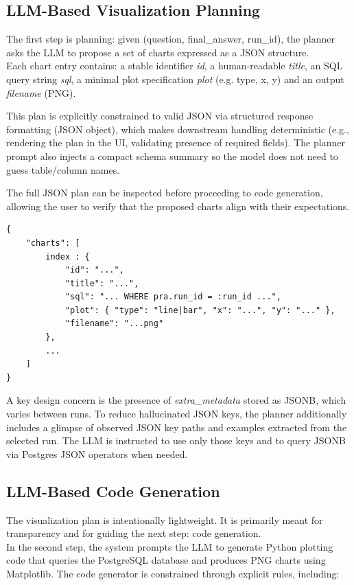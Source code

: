 \subsection{LLM-Based Visualization Planning}

The first step is planning: given (question, final\_answer, run\_id), the planner asks the LLM to propose a set of charts expressed as a JSON structure. \\
Each chart entry contains: a stable identifier \textit{id}, a human-readable \textit{title}, an SQL query string \textit{sql}, a minimal plot specification \textit{plot} (e.g. type, x, y) and an output \textit{filename} (PNG).

This plan is explicitly constrained to valid JSON via structured response formatting (JSON object), which makes downstream handling deterministic (e.g., rendering the plan in the UI, validating presence of required fields). The planner prompt also injects a compact schema summary so the model does not need to guess table/column names.

The full JSON plan can be inspected before proceeding to code generation, allowing the user to verify that the proposed charts align with their expectations.

\begin{lstlisting}[caption={Example Visualization Plan JSON}, label={lst:viz-plan}]
{
    "charts": [
        index : {
            "id": "...",
            "title": "...",
            "sql": "... WHERE pra.run_id = :run_id ...",
            "plot": { "type": "line|bar", "x": "...", "y": "..." },
            "filename": "...png"
        },
        ...
    ]
}
\end{lstlisting}

A key design concern is the presence of \textit{extra\_metadata} stored as JSONB, which varies between runs. To reduce hallucinated JSON keys, the planner additionally includes a glimpse of observed JSON key paths and examples extracted from the selected run. The LLM is instructed to use only those keys and to query JSONB via Postgres JSON operators when needed.

\subsection{LLM-Based Code Generation}

The visualization plan is intentionally lightweight. It is primarily meant for transparency and for guiding the next step: code generation. \\
In the second step, the system prompts the LLM to generate Python plotting code that queries the PostgreSQL database and produces PNG charts using Matplotlib. The code generator is constrained through explicit rules, including:

